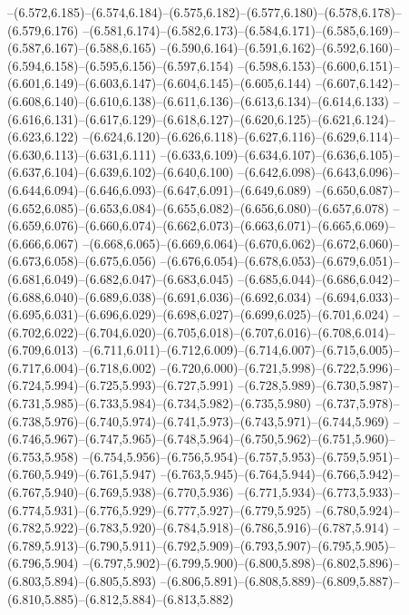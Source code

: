  --(6.572,6.185)--(6.574,6.184)--(6.575,6.182)--(6.577,6.180)--(6.578,6.178)--(6.579,6.176)%
  --(6.581,6.174)--(6.582,6.173)--(6.584,6.171)--(6.585,6.169)--(6.587,6.167)--(6.588,6.165)%
  --(6.590,6.164)--(6.591,6.162)--(6.592,6.160)--(6.594,6.158)--(6.595,6.156)--(6.597,6.154)%
  --(6.598,6.153)--(6.600,6.151)--(6.601,6.149)--(6.603,6.147)--(6.604,6.145)--(6.605,6.144)%
  --(6.607,6.142)--(6.608,6.140)--(6.610,6.138)--(6.611,6.136)--(6.613,6.134)--(6.614,6.133)%
  --(6.616,6.131)--(6.617,6.129)--(6.618,6.127)--(6.620,6.125)--(6.621,6.124)--(6.623,6.122)%
  --(6.624,6.120)--(6.626,6.118)--(6.627,6.116)--(6.629,6.114)--(6.630,6.113)--(6.631,6.111)%
  --(6.633,6.109)--(6.634,6.107)--(6.636,6.105)--(6.637,6.104)--(6.639,6.102)--(6.640,6.100)%
  --(6.642,6.098)--(6.643,6.096)--(6.644,6.094)--(6.646,6.093)--(6.647,6.091)--(6.649,6.089)%
  --(6.650,6.087)--(6.652,6.085)--(6.653,6.084)--(6.655,6.082)--(6.656,6.080)--(6.657,6.078)%
  --(6.659,6.076)--(6.660,6.074)--(6.662,6.073)--(6.663,6.071)--(6.665,6.069)--(6.666,6.067)%
  --(6.668,6.065)--(6.669,6.064)--(6.670,6.062)--(6.672,6.060)--(6.673,6.058)--(6.675,6.056)%
  --(6.676,6.054)--(6.678,6.053)--(6.679,6.051)--(6.681,6.049)--(6.682,6.047)--(6.683,6.045)%
  --(6.685,6.044)--(6.686,6.042)--(6.688,6.040)--(6.689,6.038)--(6.691,6.036)--(6.692,6.034)%
  --(6.694,6.033)--(6.695,6.031)--(6.696,6.029)--(6.698,6.027)--(6.699,6.025)--(6.701,6.024)%
  --(6.702,6.022)--(6.704,6.020)--(6.705,6.018)--(6.707,6.016)--(6.708,6.014)--(6.709,6.013)%
  --(6.711,6.011)--(6.712,6.009)--(6.714,6.007)--(6.715,6.005)--(6.717,6.004)--(6.718,6.002)%
  --(6.720,6.000)--(6.721,5.998)--(6.722,5.996)--(6.724,5.994)--(6.725,5.993)--(6.727,5.991)%
  --(6.728,5.989)--(6.730,5.987)--(6.731,5.985)--(6.733,5.984)--(6.734,5.982)--(6.735,5.980)%
  --(6.737,5.978)--(6.738,5.976)--(6.740,5.974)--(6.741,5.973)--(6.743,5.971)--(6.744,5.969)%
  --(6.746,5.967)--(6.747,5.965)--(6.748,5.964)--(6.750,5.962)--(6.751,5.960)--(6.753,5.958)%
  --(6.754,5.956)--(6.756,5.954)--(6.757,5.953)--(6.759,5.951)--(6.760,5.949)--(6.761,5.947)%
  --(6.763,5.945)--(6.764,5.944)--(6.766,5.942)--(6.767,5.940)--(6.769,5.938)--(6.770,5.936)%
  --(6.771,5.934)--(6.773,5.933)--(6.774,5.931)--(6.776,5.929)--(6.777,5.927)--(6.779,5.925)%
  --(6.780,5.924)--(6.782,5.922)--(6.783,5.920)--(6.784,5.918)--(6.786,5.916)--(6.787,5.914)%
  --(6.789,5.913)--(6.790,5.911)--(6.792,5.909)--(6.793,5.907)--(6.795,5.905)--(6.796,5.904)%
  --(6.797,5.902)--(6.799,5.900)--(6.800,5.898)--(6.802,5.896)--(6.803,5.894)--(6.805,5.893)%
  --(6.806,5.891)--(6.808,5.889)--(6.809,5.887)--(6.810,5.885)--(6.812,5.884)--(6.813,5.882)%
